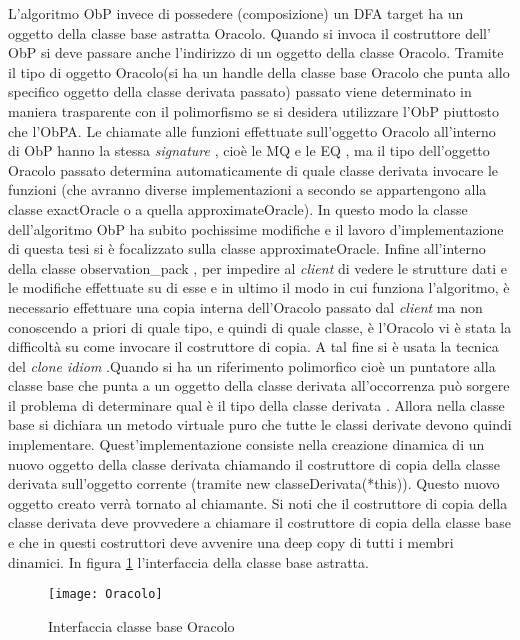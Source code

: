 L'algoritmo \ac{ObP} invece di possedere (composizione) un \ac{DFA} target ha un oggetto della classe base astratta Oracolo. Quando si invoca il costruttore dell' \ac{ObP}  si deve passare anche l'indirizzo di un oggetto della classe Oracolo. Tramite il tipo di oggetto Oracolo(si ha un handle della classe base Oracolo che punta allo specifico oggetto della classe derivata passato) passato  viene determinato in maniera trasparente con il polimorfismo se si desidera utilizzare l'\ac{ObP} piuttosto che l'\ac{ObPA}. Le chiamate alle funzioni effettuate sull'oggetto Oracolo all'interno di \ac{ObP} hanno la stessa \textit{signature} , cioè le \ac{MQ} e le \ac{EQ} , ma il tipo dell'oggetto Oracolo passato determina automaticamente di quale classe derivata invocare le funzioni (che avranno diverse implementazioni a secondo se appartengono alla classe exactOracle o a quella approximateOracle).  In questo modo la classe dell'algoritmo \ac{ObP} ha subito pochissime modifiche  e il lavoro d'implementazione di questa tesi si è focalizzato sulla classe approximateOracle. Infine all'interno della classe observation\_pack , per impedire al \textit{client} di vedere le strutture dati e le modifiche effettuate su di esse  e in ultimo il modo in cui funziona l'algoritmo, è necessario effettuare una copia interna dell'Oracolo passato dal \textit{client} ma non conoscendo a priori di quale tipo, e quindi di quale classe, è l'Oracolo vi è stata la difficoltà su come invocare il costruttore di copia. A tal fine si è usata la tecnica del \textit{clone idiom} .Quando si ha un riferimento polimorfico cioè un 
  puntatore alla classe base che punta a un oggetto della classe derivata all'occorrenza può sorgere il problema di determinare qual è il tipo della classe derivata . Allora nella classe base si dichiara un metodo virtuale puro che tutte le classi derivate devono quindi implementare. Quest'implementazione consiste nella creazione dinamica  di un nuovo oggetto della classe derivata chiamando il costruttore di copia della classe derivata sull'oggetto corrente (tramite new classeDerivata(*this)). Questo nuovo oggetto creato verrà tornato al chiamante. Si noti che il costruttore di copia della classe derivata deve provvedere a chiamare il costruttore di copia della classe base e che in questi costruttori deve avvenire una deep copy di tutti i membri dinamici.   In figura \ref{fig:cba} l'interfaccia della classe base astratta.
  
 \begin{figure}[htp]
	\centering
	\texttt{[image: Oracolo]}
	\caption[Interfaccia classe base Oracolo]{Interfaccia classe base Oracolo}
   \label{fig:cba}
\end{figure}    